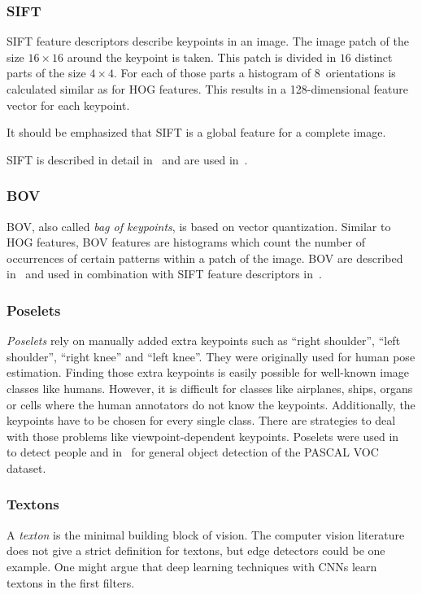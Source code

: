 \subsubsection{SIFT}
\Gls{SIFT} feature descriptors describe keypoints in an image. The image patch
of the size $16 \times 16$ around the keypoint is taken. This patch is divided
in $16$ distinct parts of the size $4 \times 4$. For each of those parts a
histogram of 8~orientations is calculated similar as for \gls{HOG} features.
This results in a 128-dimensional feature vector for each keypoint.

It should be emphasized that SIFT is a global feature for a complete image.

\Gls{SIFT} is described in detail in~\cite{raey} and are used in~\cite{plath2009multi}.


\subsubsection{BOV}
\Gls{BOV}, also called \textit{bag of keypoints}, is based on vector
quantization. Similar to \gls{HOG} features, \gls{BOV} features are histograms
which count the number of occurrences of certain patterns within a patch of the
image. \Gls{BOV} are described in~\cite{csurka2004visual} and used in
combination with \gls{SIFT} feature descriptors in~\cite{csurka2008simple}.


\subsubsection{Poselets}
\textit{Poselets} rely on manually added extra keypoints such as \enquote{right
shoulder}, \enquote{left shoulder}, \enquote{right knee} and \enquote{left
knee}. They were originally used for human pose estimation. Finding those extra
keypoints is easily possible for well-known image classes like humans. However,
it is difficult for classes like airplanes, ships, organs or cells where the
human annotators do not know the keypoints. Additionally, the keypoints have to
be chosen for every single class. There are strategies to deal with those
problems like viewpoint-dependent keypoints. Poselets were used
in~\cite{bourdev2010detecting} to detect people and in~\cite{brox2011object}
for general object detection of the PASCAL VOC dataset.

\subsubsection{Textons}\label{subsubsec:textons}
A \textit{texton} is the minimal building block of vision. The computer vision
literature does not give a strict definition for textons, but edge detectors
could be one example. One might argue that deep learning techniques with
\glspl{CNN} learn textons in the first filters.

